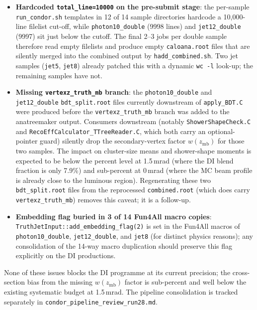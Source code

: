 \documentclass[11pt,a4paper]{article}
\begin{document}
\begin{itemize}
\item \textbf{Hardcoded \texttt{total\_line=10000} on the pre-submit
  stage}: the per-sample \texttt{run\_condor.sh} templates in 12 of 14
  sample directories hardcode a 10,000-line filelist cut-off, while
  \texttt{photon10\_double} (9998 lines) and \texttt{jet12\_double}
  (9997) sit just below the cutoff. The final 2--3 jobs per double
  sample therefore read empty filelists and produce empty
  \texttt{caloana.root} files that are silently merged into the combined
  output by \texttt{hadd\_combined.sh}. Two jet samples (\texttt{jet5},
  \texttt{jet8}) already patched this with a dynamic \texttt{wc -l}
  look-up; the remaining samples have not.
\item \textbf{Missing \texttt{vertexz\_truth\_mb} branch}: the
  \texttt{photon10\_double} and \texttt{jet12\_double}
  \texttt{bdt\_split.root} files currently downstream of
  \texttt{apply\_BDT.C} were produced before the
  \texttt{vertexz\_truth\_mb} branch was added to the anatreemaker output.
  Consumers downstream (notably \texttt{ShowerShapeCheck.C} and
  \texttt{RecoEffCalculator\_TTreeReader.C}, which both carry an
  optional-pointer guard) silently drop the secondary-vertex factor
  $w(z_\mathrm{mb})$ for those two samples. The impact on cluster-size
  means and shower-shape moments is expected to be below the percent
  level at 1.5\,mrad (where the DI blend fraction is only 7.9\%) and
  sub-percent at 0\,mrad (where the MC beam profile is already close to
  the luminous region). Regenerating these two
  \texttt{bdt\_split.root} files from the reprocessed
  \texttt{combined.root} (which does carry \texttt{vertexz\_truth\_mb})
  removes this caveat; it is a follow-up.
\item \textbf{Embedding flag buried in 3 of 14 Fun4All macro copies}:
  \texttt{TruthJetInput::add\_embedding\_flag(2)} is set in the Fun4All
  macros of \texttt{photon10\_double}, \texttt{jet12\_double}, and
  \texttt{jet8} (for distinct physics reasons); any consolidation of the
  14-way macro duplication should preserve this flag explicitly on the
  DI productions.
\end{itemize}

None of these issues blocks the DI programme at its current precision; the
cross-section bias from the missing $w(z_\mathrm{mb})$ factor is
sub-percent and well below the existing systematic budget at 1.5\,mrad.
The pipeline consolidation is tracked separately in
\texttt{condor\_pipeline\_review\_run28.md}.
\end{document}
